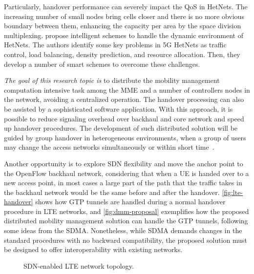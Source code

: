 Particularly, handover performance can severely impact the \ac{QoS} in
\acp{HetNet}. The increasing number of small nodes bring cells closer and there
is no more obvious boundary between them, enhancing the capacity per area by
the space division multiplexing. \citet{Sun2015} propose intelligent schemes
to handle the dynamic environment of \acp{HetNet}. The authors identify some
key problems in 5G \acp{HetNet} as traffic control, load balancing, density
prediction, and resource allocation. Then, they develop a number of smart
schemes to overcome these challenges.

\emph{The goal of this research topic is} to distribute the mobility management
computation intensive task among the \ac{MME} and a number of controllers nodes
in the network, avoiding a centralized operation. The handover processing can
also be assisted by a sophisticated software application. With this approach,
it is possible to reduce signaling overhead over backhaul and core network and
speed up handover procedures. The development of such distributed solution will
be guided by group handover in heterogeneous environments, when a group of
users may change the access networks simultaneously or within short
time~\cite{Chowdhury2012}.

Another opportunity is to explore \ac{SDN} flexibility and move the anchor
point to the OpenFlow backhaul network, considering that when a \ac{UE} is
handed over to a new access point, in most cases a large part of the path that
the traffic takes in the backhaul network would be the same before and after
the handover. \autoref{fig:lte-handover} shows how \ac{GTP} tunnels are handled
during a normal handover procedure in \ac{LTE} networks, and
\autoref{fig:dmm-proposal} exemplifies how the proposed distributed mobility
management solution can handle the \ac{GTP} tunnels, following some ideas from
the \ac{SDMA}. Nonetheless, while \ac{SDMA} demands changes in the standard
procedures with no backward compatibility, the proposed solution must be
designed to offer interoperability with existing networks.

\begin{figure}[htb]
  \centering
  \hfil \hspace{1cm}
  \caption{\acs{SDN}-enabled \acs{LTE} network topology.}
  \label{fig:dmm}
\end{figure}

